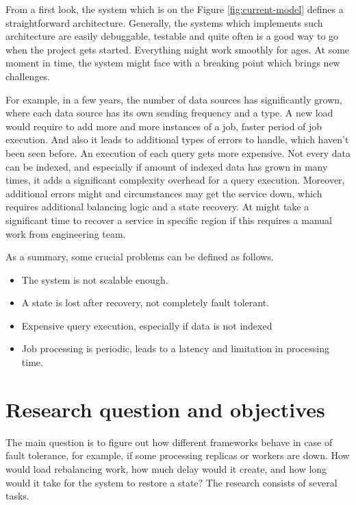 From a first look, the system which is on the Figure \ref{fig:current-model} defines a straightforward
architecture.
Generally, the systems which implements such architecture are easily debuggable,
testable and quite often is a good way to go when the project gets started.
Everything might work smoothly for ages.
At some moment in time, the system might face with a breaking point which brings new challenges.

For example, in a few years, the number of data sources has significantly grown, where each
data source has its own sending frequency and a type.
A new load would require to add more and more instances of a job, faster period of job execution.
And also it leads to additional types of errors to handle, which haven't been seen before.
An execution of each query gets more expensive.
Not every data can be indexed, and especially if amount of indexed data has grown in many times, it adds
a significant complexity overhead for a query execution.
Moreover, additional errors might and circumstances may get the service down, which requires
additional balancing logic and a state recovery.
At might take a significant time to recover a service in specific region if this requires a manual work
from engineering team.

As a summary, some crucial problems can be defined as follows.

\begin{itemize}
    \item The system is not scalable enough.
    \item A state is lost after recovery, not completely fault tolerant.
    \item Expensive query execution, especially if data is not indexed
    \item Job processing is periodic, leads to a latency and limitation in processing time.
\end{itemize}

\newpage
\section{Research question and objectives}\label{sec:res-q-o}
The main question is to figure out how different frameworks behave in case of fault tolerance,
for example, if some processing replicas or workers are down.
How would load rebalancing work, how much delay would it create,
and how long would it take for the system to restore a state?
The research consists of several tasks.

